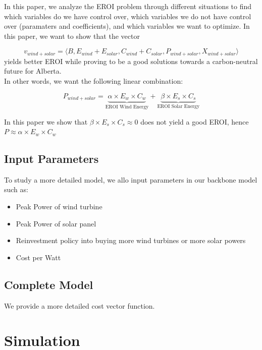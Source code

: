 \documentclass[12pt]{article}
\begin{document}
In this paper, we analyze the EROI problem through different situations to find which variables do we have control over, which variables we do not have control over (paramaters and coefficients), and which variables we want to optimize. In this paper, we want to show that the vector 

\begin{displaymath}
v_{wind+solar}= \langle B, E_{wind} + E_{solar}, C_{wind} + C_{solar}, P_{wind + solar}, X_{wind+solar}\rangle
\end{displaymath}
 yields better EROI while proving to be a good solutions towards a carbon-neutral future for Alberta. \\

In other words, we want the following linear combination:

\begin{displaymath}
P_{wind+solar} = \underbrace{\alpha \times E_w \times C_w}_\text{EROI Wind Energy} + \underbrace{ \beta \times E_s \times C_s}_\text{EROI Solar Energy}
\end{displaymath}

In this paper we show that $\beta \times E_s \times C_s \approx 0$ does not yield a good EROI, hence $P \approx \alpha \times E_w \times C_w $\\

\subsection{Input Parameters}

To study a more detailed model, we allo input parameters in our backbone model such as:
\begin{itemize}
\item Peak Power of wind turbine
\item Peak Power of solar panel
\item Reinvestment policy into buying more wind turbines or more solar powers
\item Cost per Watt
\end{itemize}

\subsection{Complete Model}

We provide a more detailed cost vector function. 

\section{Simulation}
\end{document}
